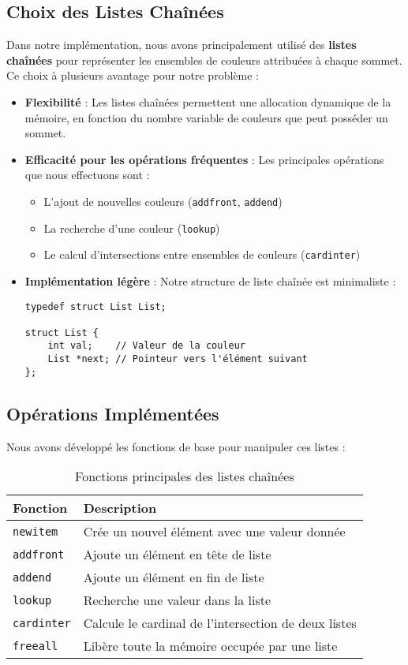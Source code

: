 \documentclass[a4paper,11pt]{article}
\begin{document}
\subsection{Choix des Listes Chaînées}

Dans notre implémentation, nous avons principalement utilisé des \textbf{listes chaînées} pour représenter les ensembles de couleurs attribuées à chaque sommet.
Ce choix à plusieurs avantage pour notre problème : 

\begin{itemize}
\item \textbf{Flexibilité} : Les listes chaînées permettent une allocation dynamique de la mémoire, en fonction du nombre variable de couleurs que peut posséder un sommet.

\item \textbf{Efficacité pour les opérations fréquentes} : Les principales opérations que nous effectuons sont :
  \begin{itemize}
  \item L'ajout de nouvelles couleurs (\texttt{addfront}, \texttt{addend})
  \item La recherche d'une couleur (\texttt{lookup})
  \item Le calcul d'intersections entre ensembles de couleurs (\texttt{cardinter})
  \end{itemize}
  
\item \textbf{Implémentation légère} : Notre structure de liste chaînée est minimaliste :
\begin{verbatim}
typedef struct List List;

struct List {
    int val;    // Valeur de la couleur
    List *next; // Pointeur vers l'élément suivant
};
\end{verbatim}
\end{itemize}

\subsection{Opérations Implémentées}

Nous avons développé les fonctions de base pour manipuler ces listes :

\begin{table}[h]
\centering
\caption{Fonctions principales des listes chaînées}
\begin{tabular}{lp{8cm}}
\toprule
Fonction & Description \\
\midrule
\texttt{newitem} & Crée un nouvel élément avec une valeur donnée \\
\texttt{addfront} & Ajoute un élément en tête de liste \\
\texttt{addend} & Ajoute un élément en fin de liste \\
\texttt{lookup} & Recherche une valeur dans la liste \\
\texttt{cardinter} & Calcule le cardinal de l'intersection de deux listes \\
\texttt{freeall} & Libère toute la mémoire occupée par une liste \\
\bottomrule
\end{tabular}
\end{table}
\end{document}
